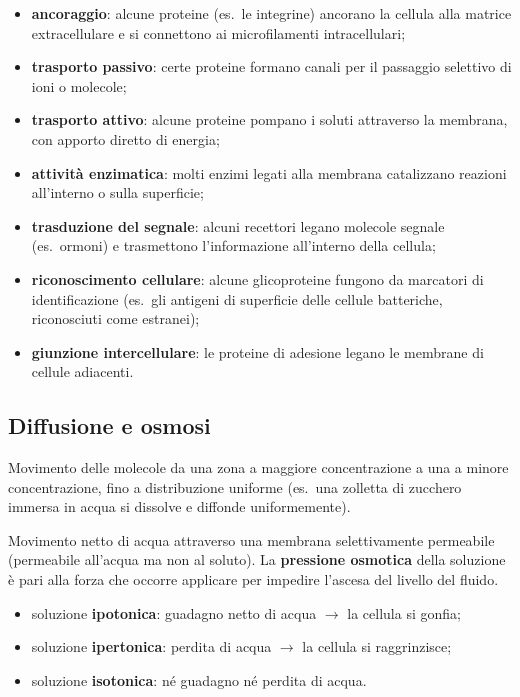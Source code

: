 \begin{itemize}
  \item \textbf{ancoraggio}: alcune proteine (es.\ le integrine) ancorano la cellula alla matrice extracellulare e si connettono ai microfilamenti intracellulari;
  \item \textbf{trasporto passivo}: certe proteine formano canali per il passaggio selettivo di ioni o molecole;
  \item \textbf{trasporto attivo}: alcune proteine pompano i soluti attraverso la membrana, con apporto diretto di energia;
  \item \textbf{attività enzimatica}: molti enzimi legati alla membrana catalizzano reazioni all'interno o sulla superficie;
  \item \textbf{trasduzione del segnale}: alcuni recettori legano molecole segnale (es.\ ormoni) e trasmettono l'informazione all'interno della cellula;
  \item \textbf{riconoscimento cellulare}: alcune glicoproteine fungono da marcatori di identificazione (es.\ gli antigeni di superficie delle cellule batteriche, riconosciuti come estranei);
  \item \textbf{giunzione intercellulare}: le proteine di adesione legano le membrane di cellule adiacenti.
\end{itemize}

\subsection{Diffusione e osmosi}

Movimento delle molecole da una zona a maggiore concentrazione a una a minore concentrazione, fino a distribuzione uniforme (es.\ una zolletta di zucchero immersa in acqua si dissolve e diffonde uniformemente).

Movimento netto di acqua attraverso una membrana selettivamente permeabile (permeabile all'acqua ma non al soluto). La \textbf{pressione osmotica} della soluzione è pari alla forza che occorre applicare per impedire l'ascesa del livello del fluido.
\begin{itemize}
  \item soluzione \textbf{ipotonica}: guadagno netto di acqua $\rightarrow$ la cellula si gonfia;
  \item soluzione \textbf{ipertonica}: perdita di acqua $\rightarrow$ la cellula si raggrinzisce;
  \item soluzione \textbf{isotonica}: né guadagno né perdita di acqua.
\end{itemize}

